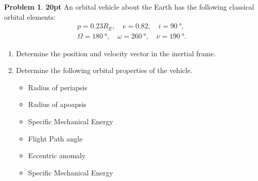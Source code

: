 \documentclass[10pt]{article}
\theoremstyle{definition}
\newtheorem{prob}{Problem}[section]
\newenvironment{subprob}%
{\renewcommand{\theenumi}{\alph{enumi}}\renewcommand{\labelenumi}{(\theenumi)}\begin{enumerate}}%
{\end{enumerate}}%
\begin{document}
\clearpage\newpage
\null\newpage
\null\newpage
\begin{prob}
    \textbf{20pt}
    An orbital vehicle about the Earth has the following classical orbital elements:
    \begin{align}
        p = 0.23 R_{E}, \quad e = 0.82, \quad i = \SI{90}{\degree}, \\
        \Omega = \SI{180}{\degree}, \quad \omega = \SI{260}{\degree}, \quad \nu = \SI{190}{\degree}.
    \end{align}
   
\begin{subprob}
    \item Determine the position and velocity vector in the inertial frame.
    \item Determine the following orbital properties of the vehicle.
        \begin{itemize}
            \item Radius of periapsis
            \item Radius of apoapsis
            \item Specific Mechanical Energy
            \item Flight Path angle
            \item Eccentric anomaly
            \item Specific Mechanical Energy
        \end{itemize}
\end{subprob}
\end{prob}
\clearpage\newpage
\null\newpage
\null\newpage
\end{document}
